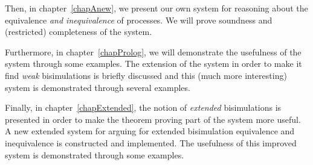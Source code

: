 Then, in chapter~\ref{chapAnew}, we present our own system for reasoning about the equivalence {\it and inequivalence\/} of processes. We will prove soundness and (restricted) completeness of the system.

Furthermore, in chapter~\ref{chapProlog}, we will demonstrate the usefulness of the system through some examples. The extension of the system in order to make it find {\it weak\/} bisimulations is briefly discussed and this (much more interesting) system is demonstrated through several examples.

Finally, in chapter~\ref{chapExtended}, the notion of {\it extended\/} bisimulations is presented in order to make the theorem proving part of the system more useful. A new extended system for arguing for extended bisimulation equivalence and inequivalence is constructed and implemented. The usefulness of this improved system is demonstrated through some examples.





